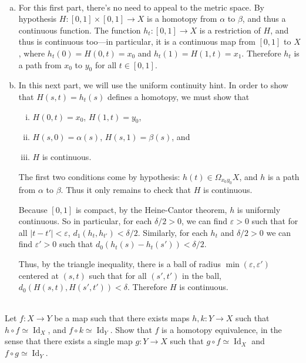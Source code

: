 \documentclass{article}
\newenvironment{problem}[2][Problem]{\begin{trivlist}
\item[\hskip \labelsep {\bfseries #1}\hskip \labelsep {\bfseries #2.}]}{\end{trivlist}}
\newenvironment{solution}[1][Solution.]{\begin{trivlist}
\item[\hskip \labelsep {\bfseries #1}]}{\end{trivlist}}
\begin{document}
\begin{solution} \text{} \\
  \begin{enumerate}[a.]
    \item For this first part, there's no need to appeal to the metric space.
      By hypothesis $H\colon [0, 1] \times [0, 1] \rightarrow X$ is a homotopy
      from $\alpha$ to $\beta$, and thus a continuous function.
      The function $h_t\colon [0, 1] \rightarrow X$ is a restriction of $H$, and
      thus is continuous too---in particular, it is a continuous map from
      $[0, 1]$ to $X$,
      where $h_t(0) = H(0, t) = x_0$ and $h_t(1) = H(1, t) = x_1$.
      Therefore $h_t$ is a path from $x_0$ to $y_0$ for all $t \in [0, 1]$.
    \item In this next part, we will use the uniform continuity hint.
      In order to show that $H(s, t) = h_t(s)$ defines a homotopy, we must show
      that \begin{enumerate}[(i)]
        \item $H(0, t) = x_0$, $H(1, t) = y_0$,
        \item $H(s, 0) = \alpha(s)$, $H(s, 1) = \beta(s)$, and
        \item $H$ is continuous.
      \end{enumerate}
      The first two conditions come by hypothesis: $h(t) \in \Omega_{x_0y_0}X$,
      and $h$ is a path from $\alpha$ to $\beta$. Thus it only remains to check
      that $H$ is continuous.

      Because $[0, 1]$ is compact, by the Heine-Cantor theorem,
      $h$ is uniformly continuous. So in particular, for each $\delta/2 > 0$, we
      can find $\varepsilon > 0$ such that for all $|t - t'| < \varepsilon$,
      $d_1(h_t, h_{t'}) < \delta/2$. Similarly, for each $h_t$ and $\delta/2 > 0$
      we can find $\varepsilon' > 0$ such that $d_0(h_t(s) - h_t(s')) < \delta/2$.

      Thus, by the triangle inequality, there is a ball of radius
      $\min(\varepsilon, \varepsilon')$ centered at $(s, t)$ such that for all
      $(s', t')$ in the ball, $d_0(H(s, t), H(s', t')) < \delta$. Therefore $H$
      is continuous.
  \end{enumerate}
\end{solution}
\pagebreak
\begin{problem}{3} \text{} \\
  Let $f\colon X\rightarrow Y$ be a map such that there exists maps
  $h,k\colon Y \rightarrow X$ such that $h\circ f \simeq \operatorname{Id}_X$,
  and $f \circ k \simeq \operatorname{Id}_Y$. Show that $f$ is a homotopy
  equivalence, in the sense that there exists a single map
  $g\colon Y \rightarrow X$ such that
  $g \circ f \simeq \operatorname{Id}_X$ and
  $f \circ g \simeq \operatorname{Id}_Y$.
\end{problem}
\end{document}
